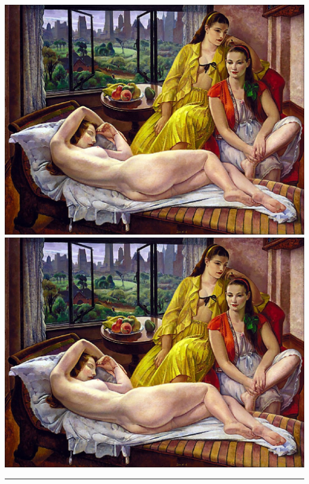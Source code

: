\documentclass{book}
\makeatletter
\newcommand{\cleartoevenpage}{%
  \clearpage%
  \ifoddpage\c@page\hbox{}\clearpage\fi}
\makeatother
\begin{document}
\cleartoevenpage
\includegraphics[height=\textheight]{leoncroll}
\newpage
\hspace*{-\textwidth}\includegraphics[height=\textheight]{leoncroll}\hspace{1em}
\parbox[b]{0.3\textwidth}{\lipsum*[1-2]\par \rule{1pt}{160pt}}
\end{document}
